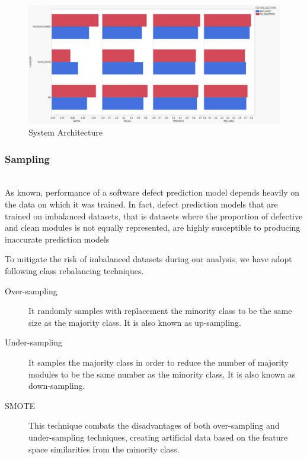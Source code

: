 \documentclass[sigconf]{acmart}
\begin{document}
\begin{figure}[h]
  \centering
  \includegraphics[width=\linewidth]{1 - BOOKKEEPER - FeatureSelectionWithoutSampling.png}
  \caption{System Architecture}
  \label{fig:BOOKKEEPER:FeatureSelectionWithoutSampling}
\end{figure}

\subsubsection{Sampling}
\hfill\\

As known, performance of a software defect prediction model depends heavily on the data on which it was trained. In fact, defect prediction models that are trained on imbalanced datasets, that is datasets where the proportion of defective and clean modules is not equally represented, are highly susceptible to producing inaccurate prediction models \cite{FalessiSampling}

To mitigate the risk of imbalanced datasets during our analysis, we have adopt following class rebalancing techniques.

\begin{description}
\item[Over-sampling] It randomly samples with replacement the minority class to be the same size as the majority class. It is also known as up-sampling.

\item[Under-sampling] It samples the majority class in order to reduce the number of majority modules to be the same number as the minority class. It is also known as down-sampling.

\item[SMOTE] This technique combats the disadvantages of both over-sampling and under-sampling techniques, creating artificial data based on the feature space similarities from the minority class. 

\end{description}
\end{document}
